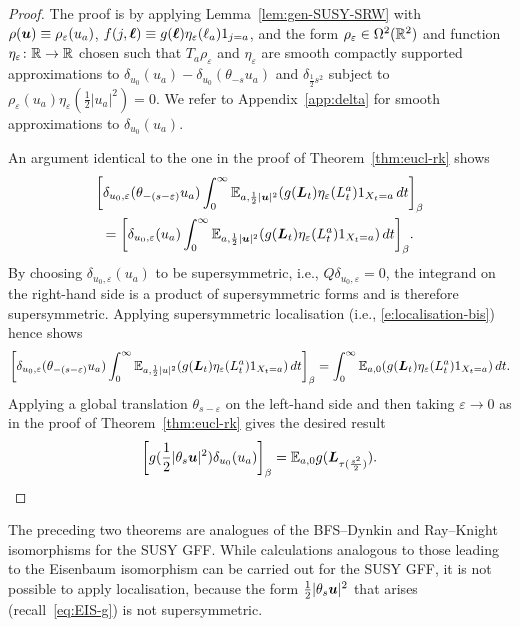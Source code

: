 \documentclass[11pt,a4paper]{article}
\begin{document}
\begin{proof}
  The proof is by applying Lemma~\ref{lem:gen-SUSY-SRW} with
  $\rho(\boldsymbol{u}) \equiv \rho_{\varepsilon}(u_{a})$,
  $f(j,\boldsymbol{\ell}) \equiv  g(\boldsymbol{\ell})\eta_{\varepsilon}(\ell_a)1_{j=a}$, and the form
  $\rho_{\varepsilon} \in \Omega^{2}(\mathbb{R}^{2})$ and function $ \eta_{\varepsilon} \colon\mathbb{R}\to\mathbb{R}$ chosen such that
  $T_{a}\rho_{\varepsilon}$ and $ \eta_{\varepsilon}$ are smooth compactly supported approximations
  to $\delta_{u_0}(u_a)-\delta_{u_0}(\theta_{-s}u_a)$ and $\delta_{\frac{1}{2}s^{2}}$
  subject to $\rho_{\varepsilon}(u_a) \eta_{\varepsilon} (\frac{1}{2}|u_a|^{2})=0$.
  We refer to Appendix~\ref{app:delta} for smooth approximations to $\delta_{u_0}(u_a)$. 
     
  An argument identical to the one in the proof of
  Theorem~\ref{thm:eucl-rk} shows
  \begin{multline}
    \uspin{\delta_{u_0,\varepsilon}(\theta_{-(s-\varepsilon)}u_a)\int_{0}^{\infty}\E_{a,\frac{1}{2}|\V{u}|^2}(g(\V{L}_t)\eta_\varepsilon(L_t^a)1_{X_t = a}\,dt}_\beta
    \\
    =
    \uspin{\delta_{u_0,\varepsilon}(u_a)\int_{0}^{\infty}\E_{a,\frac{1}{2}|\V{u}|^2}(g(\V{L}_t)\eta_\varepsilon(L_t^a)1_{X_t = a})\,dt}_\beta
    .
  \end{multline}
  By choosing $\delta_{u_0,\varepsilon}(u_a)$ to be supersymmetric, i.e., $Q\delta_{u_0,\varepsilon} = 0$, the integrand on the right-hand side is a product of supersymmetric forms and is therefore supersymmetric.  Applying supersymmetric
  localisation (i.e., \eqref{e:localisation-bis}) hence shows
  \begin{equation}
   \uspin{\delta_{u_0,\varepsilon}(\theta_{-(s-\varepsilon)}u_a)\int_{0}^{\infty}\E_{a,\frac{1}{2}|u|^2}(g(\V{L}_t)\eta_\varepsilon(L_t^a)1_{X_t = a})\,dt}_\beta =
   \int_{0}^{\infty}\E_{a,0}(g(\V{L}_t)\eta_\varepsilon(L_t^a)1_{X_t = a})\,dt.
  \end{equation}
  Applying a global translation $\theta_{s-\varepsilon}$ on the left-hand side and then taking $\varepsilon \rightarrow 0$
  as in the proof of Theorem~\ref{thm:eucl-rk} gives the desired result
  \begin{equation*}
    \uspin{g(\frac{1}{2}|\theta_{s}\V{u}|^2)\delta_{u_0}(u_a)}_{\beta} =  \E_{a,0}g(\V{L}_{\tau(\frac{s^2}{2})}).\qedhere
  \end{equation*}
\end{proof}

The preceding two theorems are analogues of the BFS--Dynkin
and Ray--Knight isomorphisms for the SUSY GFF. While calculations
analogous to those leading to the Eisenbaum isomorphism can be
carried out for the SUSY GFF, it is not possible to apply
localisation, because the form $\frac{1}{2}|\theta_{s}\boldsymbol{u}|^{2}$
that arises (recall~\eqref{eq:EIS-g}) is not supersymmetric.
\end{document}
